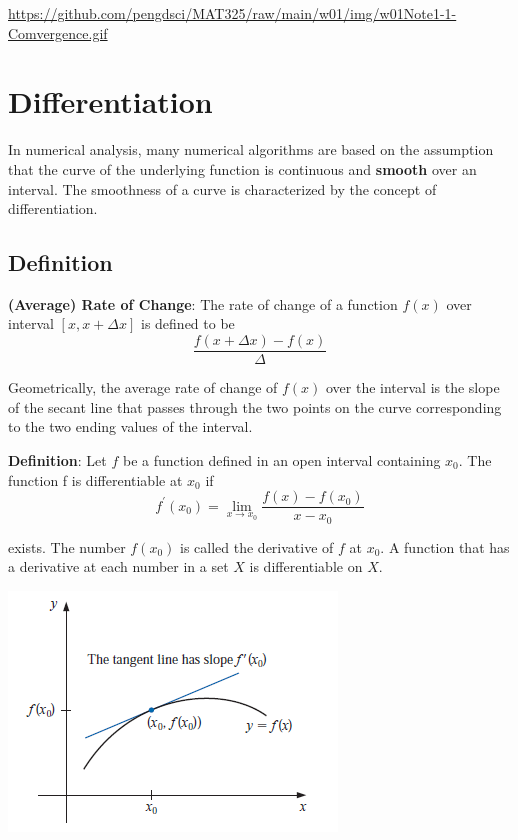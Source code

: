 \documentclass[
]{book}
\begin{document}
\url{https://github.com/pengdsci/MAT325/raw/main/w01/img/w01Note1-1-Comvergence.gif}

\hfill\break

\hypertarget{differentiation}{%
\section{Differentiation}\label{differentiation}}

In numerical analysis, many numerical algorithms are based on the assumption that the curve of the underlying function is continuous and \textbf{smooth} over an interval. The smoothness of a curve is characterized by the concept of differentiation.

\hypertarget{definition}{%
\subsection{Definition}\label{definition}}

\textbf{(Average) Rate of Change}: The rate of change of a function \(f(x)\) over interval \([x, x+\Delta x]\) is defined to be
\[
\frac{f(x+\Delta x) - f(x)}{\Delta}
\]

Geometrically, the average rate of change of \(f(x)\) over the interval is the slope of the secant line that passes through the two points on the curve corresponding to the two ending values of the interval.

\textbf{Definition}: Let \(f\) be a function defined in an open interval containing \(x_0\). The function f is differentiable at \(x_0\) if
\[
f^\prime(x_0) = \lim_{x\to x_0}\frac{f (x)-f (x_0)}{x-x_0}
\]

exists. The number \(f(x_0)\) is called the derivative of \(f\) at \(x_0\). A function that has a derivative at each number in a set \(X\) is differentiable on \(X\).

\begin{center}\includegraphics[width=0.75\linewidth]{img01/w01-Derivative} \end{center}
\end{document}
